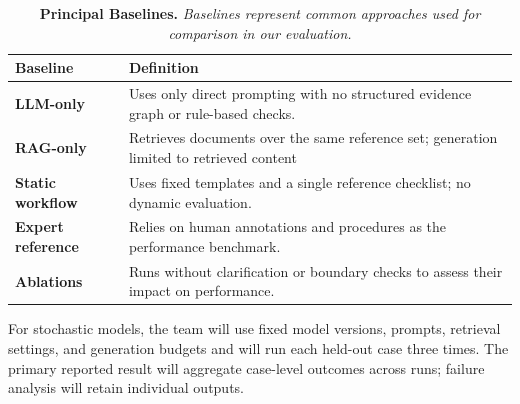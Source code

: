 \documentclass[11pt,letterpaper]{article}
\begin{document}
\begin{table}[H]
    \centering
    \small
    \begin{tabularx}{\textwidth}{P{0.16\textwidth}Y}
    \toprule
    \textbf{Baseline} & \textbf{Definition}\\
    \midrule
    \textbf{LLM-only} & Uses only direct prompting with no structured evidence graph or rule-based checks.\\
    \textbf{RAG-only} & Retrieves documents over the same reference set; generation limited to retrieved content\\
    \textbf{Static workflow} & Uses fixed templates and a single reference checklist; no dynamic evaluation.\\
     \textbf{Expert reference} & Relies on human annotations and procedures as the performance benchmark.\\
    \textbf{Ablations} & Runs without clarification or boundary checks to assess their impact on performance.\\
    \bottomrule
    \end{tabularx}
    \caption{\textbf{Principal Baselines.} \textit{Baselines represent common approaches used for comparison in our evaluation.}}
    \label{tab:principal}
\end{table}
\vspace{-10pt}


For stochastic models, the team will use fixed model versions, prompts, retrieval settings, and generation budgets and will run each held-out case three times. The primary reported result will aggregate case-level outcomes across runs; failure analysis will retain individual outputs.
\end{document}
